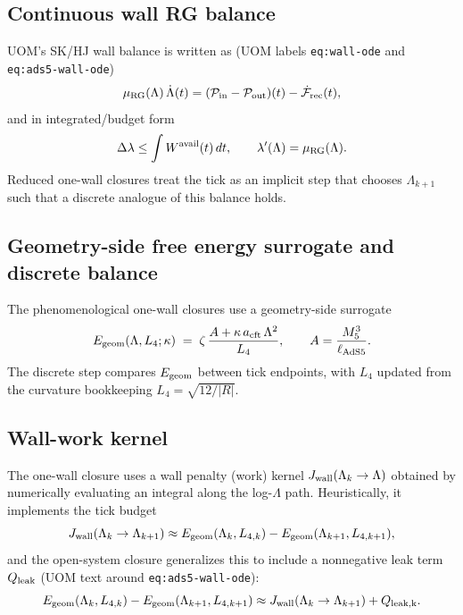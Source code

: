 \documentclass[11pt]{article}
\theoremstyle{definition}
\theoremstyle{plain}
\theoremstyle{remark}
\newcommand{\abs}[1]{\left\lvert #1\right\rvert}
\begin{document}
\subsection{Continuous wall RG balance}
\label{subsec:wall-balance}

UOM's SK/HJ wall balance is written as (UOM labels \texttt{eq:wall-ode} and \texttt{eq:ads5-wall-ode})
\begin{equation}
\mu_{\rm RG}(\Lambda)\,\dot\Lambda(t)
= (\mathcal P_{\rm in}-\mathcal P_{\rm out})(t) - \dot{\mathcal F}_{\rm rec}(t),
\label{eq:wall-ode-note}
\end{equation}
and in integrated/budget form
\begin{equation}
\Delta\lambda
\le \int W^{\rm avail}(t)\,dt,
\qquad \lambda'(\Lambda)=\mu_{\rm RG}(\Lambda).
\label{eq:wall-budget-note}
\end{equation}
Reduced one-wall closures treat the tick as an implicit step that chooses $\Lambda_{k+1}$ such that a discrete analogue of
this balance holds.

\subsection{Geometry-side free energy surrogate and discrete balance}
\label{subsec:geom-energy}

The phenomenological one-wall closures use a geometry-side surrogate
\begin{equation}
E_{\rm geom}(\Lambda,L_4;\kappa)
\;=\;
\zeta\,\frac{A+\kappa\,a_{\rm cft}\,\Lambda^2}{L_4},
\qquad
A=\frac{M_5^3}{\ell_{\rm AdS5}}.
\label{eq:Egeom}
\end{equation}
The discrete step compares $E_{\rm geom}$ between tick endpoints, with $L_4$ updated from the curvature bookkeeping
$L_4=\sqrt{12/\abs{R}}$.

\subsection{Wall-work kernel}
\label{subsec:wall-kernel}

The one-wall closure uses a wall penalty (work) kernel $J_{\rm wall}(\Lambda_k\to\Lambda)$ obtained by numerically
evaluating an integral along the log-$\Lambda$ path. Heuristically, it implements the tick budget
\begin{equation}
J_{\rm wall}(\Lambda_k\to\Lambda_{k+1}) \approx E_{\rm geom}(\Lambda_k,L_{4,k})-E_{\rm geom}(\Lambda_{k+1},L_{4,k+1}),
\label{eq:discrete-balance-no-leak}
\end{equation}
and the open-system closure generalizes this to include a nonnegative leak term $Q_{\rm leak}$ (UOM text around
\texttt{eq:ads5-wall-ode}):
\begin{equation}
E_{\rm geom}(\Lambda_k,L_{4,k})-E_{\rm geom}(\Lambda_{k+1},L_{4,k+1})
\approx
J_{\rm wall}(\Lambda_k\to\Lambda_{k+1}) + Q_{\rm leak,k}.
\label{eq:discrete-balance-leak}
\end{equation}
\end{document}
